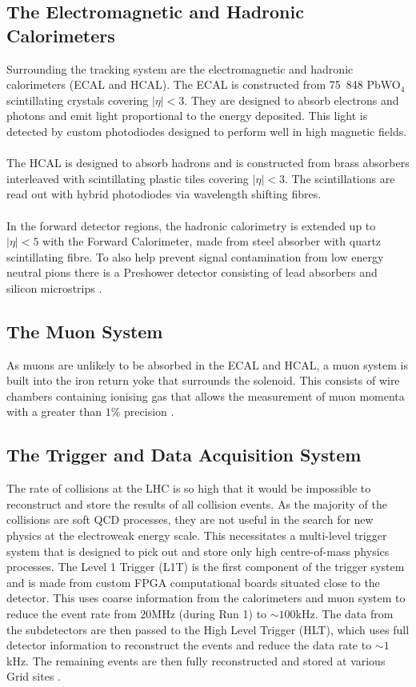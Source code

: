 \subsection{The Electromagnetic and Hadronic Calorimeters}
Surrounding the tracking system are the electromagnetic and hadronic calorimeters (ECAL and HCAL). The ECAL is constructed from 75~848 PbWO$_4$ scintillating crystals covering $|\eta|<3$. They are designed to absorb electrons and photons and emit light proportional to the energy deposited. This light is detected by custom photodiodes designed to perform well in high magnetic fields.
\\\\
The HCAL is designed to absorb hadrons and is constructed from brass absorbers interleaved with scintillating plastic tiles covering $|\eta|<3$. The scintillations are read out with hybrid photodiodes via wavelength shifting fibres.
\\\\
In the forward detector regions, the hadronic calorimetry is extended up to $|\eta|<5$ with the Forward Calorimeter, made from steel absorber with quartz scintillating fibre. To also help prevent signal contamination from low energy neutral pions there is a Preshower detector consisting of lead absorbers and silicon microstrips \cite{CMSTechDesign1DetectorPerformance}\cite{Cutajar}.

\subsection{The Muon System}
As muons are unlikely to be absorbed in the ECAL and HCAL, a muon system is built into the iron return yoke that surrounds the solenoid.  This consists of wire chambers containing ionising gas that allows the measurement of muon momenta with a greater than $1\%$ precision \cite{CMS_Overview_Chatrchyan:2008aa}.

\subsection{The Trigger and Data Acquisition System}
The rate of collisions at the LHC is so high that it would be impossible to reconstruct and store the results of all collision events. As the majority of the collisions are soft QCD processes, they are not useful in the search for new physics at the electroweak energy scale. This necessitates a multi-level trigger system that is designed to pick out and store only high centre-of-mass physics processes. The Level 1 Trigger (L1T) is the first component of the trigger system and is made from custom FPGA computational boards situated close to the detector. This uses coarse information from the calorimeters and muon system to reduce the event rate from $20$MHz (during Run 1) to $\sim100$kHz. The data from the subdetectors are then passed to the High Level Trigger (HLT), which uses full detector information to reconstruct the events and reduce the data rate to $\sim1$kHz. The remaining events are then fully reconstructed and stored at various Grid sites \cite{GridTechDesign}.



